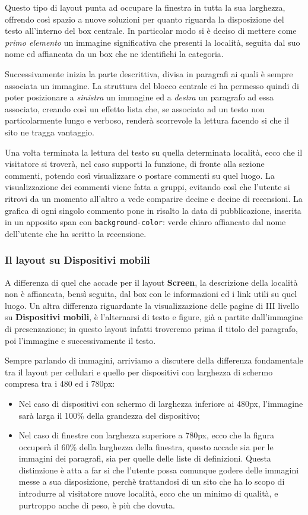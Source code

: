 Questo tipo di layout punta ad occupare la finestra in tutta la sua larghezza,
offrendo così spazio a nuove soluzioni per quanto riguarda la disposizione del
testo all'interno del box centrale. In particolar modo si è deciso di mettere
come \textit{primo elemento} un immagine significativa che presenti la
località, seguita dal suo nome ed affiancata da un box che ne identifichi la
categoria.

Successivamente inizia la parte descrittiva, divisa in paragrafi ai quali è
sempre associata un immagine. La struttura del blocco centrale ci ha permesso
quindi di poter posizionare a \textit{sinistra} un immagine ed a
\textit{destra} un paragrafo ad essa associato, creando così un effetto lista
che, se associato ad un testo non particolarmente lungo e verboso, renderà
scorrevole la lettura facendo si che il sito ne tragga vantaggio.

Una volta terminata la lettura del testo su quella determinata località, ecco
che il visitatore si troverà, nel caso supporti la funzione, di fronte alla
sezione commenti, potendo così visualizzare o postare commenti su quel luogo.
La visualizzazione dei commenti viene fatta a gruppi, evitando così che
l'utente si ritrovi da un momento all'altro a vede comparire decine e decine
di recensioni. La grafica di ogni singolo commento pone in risalto la data di
pubblicazione, inserita in un apposito span con \texttt{background-color}:
verde chiaro affiancato dal nome dell'utente che ha scritto la recensione.

\subsubsection{Il layout su Dispositivi mobili}\label{sec:Pres-IIIliv-Mobile}
A differenza di quel che accade per il layout \textbf{Screen}, la descrizione
della località non è affiancata, bensì seguita, dal box con le informazioni ed
i link utili su quel luogo. Un altra differenza riguardante la visualizzazione
delle pagine di III livello su \textbf{Dispositivi mobili}, è l'alternarsi di
testo e figure, già a partite dall'immagine di presenzazione; in questo layout
infatti troveremo prima il titolo del paragrafo, poi l'immagine e
successivamente il testo.

Sempre parlando di immagini, arriviamo a discutere della differenza
fondamentale tra il layout per cellulari e quello per dispositivi con
larghezza di schermo compresa tra i 480 ed i 780px:
\begin{itemize}
\item Nel caso di dispositivi con schermo di larghezza inferiore ai 480px,
l'immagine sarà larga il 100\% della grandezza del dispositivo;
\item Nel caso di finestre con larghezza superiore a 780px, ecco che la figura
occuperà il 60\% della larghezza della finestra, questo accade sia per le
immagini dei paragrafi, sia per quelle delle liste di definizioni. Questa
distinzione è atta a far si che l'utente possa comunque godere delle immagini
messe a sua disposizione, perchè trattandosi di un sito che ha lo scopo di
introdurre al visitatore nuove località, ecco che un minimo di qualità, e
purtroppo anche di peso, è più che dovuta.
\end{itemize}

